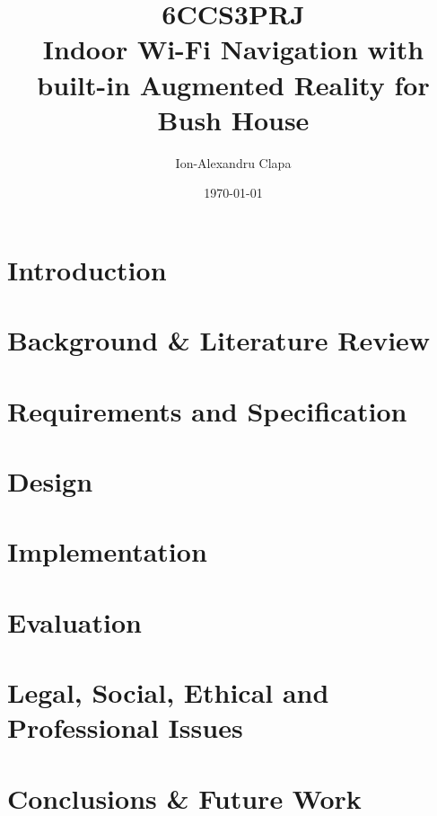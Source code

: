\documentclass[12pt]{informatics-report}
\title{6CCS3PRJ\\\vspace{0.2cm}Indoor Wi-Fi Navigation with built-in Augmented Reality for Bush House}
\author{Ion-Alexandru Clapa}
\date{\today}
\begin{document}
{%
\setlength{\fboxsep}{0pt}%
\setlength{\fboxrule}{1pt}%
}%
\captionsetup{justification=centering,margin=2cm}


\createFrontMatter
\onehalfspacing
\tableofcontents
\doublespacing
\listoffigures
\listoftables

\makenomenclature
\renewcommand{\nomname}{Abbreviations}

\newpage

\onehalfspacing
\chapter{Introduction}

\newpage
\chapter{Background \& Literature Review}

\newpage
\chapter{Requirements and Specification}

\newpage
\chapter{Design}

\newpage
\chapter{Implementation}

\newpage
\chapter{Evaluation}

\newpage
\chapter{Legal, Social, Ethical and Professional Issues}

\newpage
\chapter{Conclusions \& Future Work}


\newpage

\printnomenclature

\newpage


\end{document}
